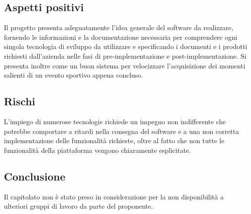 \documentclass[../studio-di-fattibilita.tex]{subfiles}
\begin{document}
\subsection{Aspetti positivi}%
\label{sub:aspetti_positivi}
Il progetto presenta adeguatamente l'idea generale del software da realizzare, fornendo le informazioni e la documentazione necessaria per 
comprendere ogni singola tecnologia di sviluppo da utilizzare e specificando i documenti e i prodotti richiesti dall'azienda nelle fasi di pre-implementazione e post-implementazione.
Si presenta inoltre come un buon sistema per velocizzare l'acquisizione dei momenti salienti di un evento sportivo appena concluso.

\subsection{Rischi}%
\label{sub:rischi}
L’impiego di numerose tecnologie richiede un impegno non indifferente che potrebbe comportare a ritardi nella consegna del software e a una non corretta implementazione delle funzionalità richieste, oltre al fatto che non tutte le funzionalità della piattaforma vengono chiaramente esplicitate.

\subsection{Conclusione}%
\label{sub:conclusione}
Il capitolato non è stato preso in considerazione per la non disponibilità a ulteriori gruppi di lavoro da parte del proponente.
\end{document}
